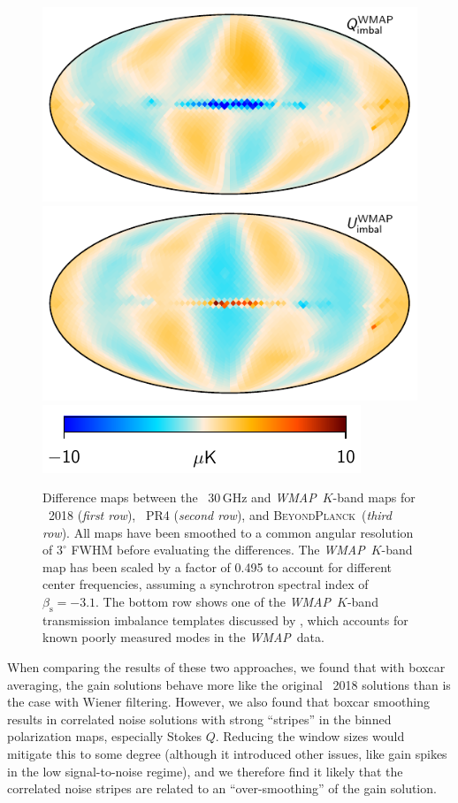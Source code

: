 \documentclass[twocolumn]{aa}
\def\WMAP{\textit{WMAP}}
\newcommand{\BP}{\textsc{BeyondPlanck}}
\begin{document}
\begin{figure}[t]
    \includegraphics[width=0.47\linewidth]{figs/wmap_loss_imbalance_template1_K1_v5_iqu_Q.pdf}
    \includegraphics[width=0.47\linewidth]{figs/wmap_loss_imbalance_template1_K1_v5_iqu_U.pdf}\\    
    \includegraphics[width=0.40\linewidth]{figs/colourbar_10uK.pdf}
    \caption{Difference maps between the \Planck\ 30\,GHz and \WMAP\ $K$-band maps for \Planck\ 2018 (\emph{first row}), \Planck\ PR4 (\emph{second row}), and \BP\ (\emph{third row}). All maps have been smoothed to a common angular resolution of $3^{\circ}$ FWHM before evaluating the differences. The \WMAP\ $K$-band map has been scaled by a factor of 0.495 to account for different center frequencies, assuming a synchrotron spectral index of $\beta_{\mathrm{s}}=-3.1$. The bottom row shows one of the \WMAP\ $K$-band transmission imbalance templates discussed by \citet{jarosik2007}, which accounts for known poorly measured modes in the \WMAP\ data. }
    \label{fig:diff_30_k}
\end{figure}

When comparing the results of these two approaches, we found that with boxcar averaging, the gain solutions behave more like the original \Planck\ 2018 solutions than is the case with Wiener filtering. However, we also found that boxcar smoothing results in correlated noise solutions with strong ``stripes'' in the binned polarization maps, especially Stokes $Q$. Reducing the window sizes would mitigate this to some degree (although it introduced other issues, like gain spikes in the low signal-to-noise regime), and we therefore find it likely that the correlated noise stripes are related to an ``over-smoothing'' of the gain solution.
\end{document}
